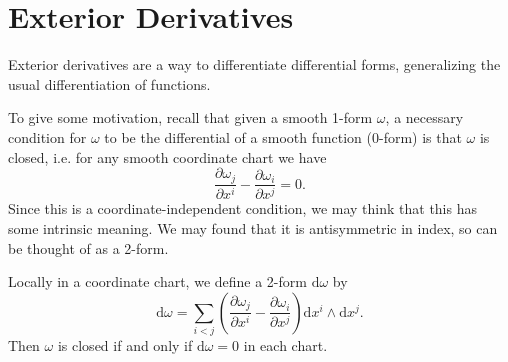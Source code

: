 \documentclass[../main.tex]{subfiles}
\begin{document}
\section{Exterior Derivatives}

Exterior derivatives are a way to differentiate differential forms, generalizing the usual differentiation of functions.

To give some motivation, recall that given a smooth 1-form $\omega$, a necessary condition for $\omega$ to be the differential of a smooth function (0-form) is that $\omega$ is closed, i.e. for any smooth coordinate chart we have
\begin{equation*}
  \frac{\partial \omega_j}{\partial x^i} - \frac{\partial \omega_i}{\partial x^j} = 0.
\end{equation*}
Since this is a coordinate-independent condition, we may think that this has some intrinsic meaning. We may found that it is antisymmetric in index, so can be thought of as a 2-form. 

Locally in a coordinate chart, we define a 2-form $\mathrm{d} \omega$ by
\begin{equation*}
  \mathrm{d} \omega = \sum_{i<j} \left(\frac{\partial \omega_j}{\partial x^i} - \frac{\partial \omega_i}{\partial x^j}\right) \mathrm{d} x^i \wedge \mathrm{d} x^j.
\end{equation*}
Then $\omega$ is closed if and only if $\mathrm{d} \omega = 0$ in each chart.
\end{document}
